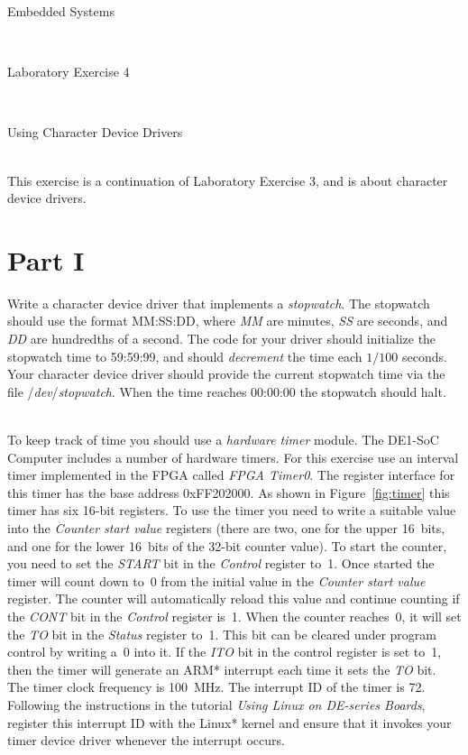 \documentclass[epsfig,10pt,fullpage]{article}
\newcommand{\LabNum}{4}
\begin{document}
\centerline{\huge Embedded Systems}
~\\
\centerline{\huge Laboratory Exercise \LabNum}
~\\
\centerline{\large Using Character Device Drivers}
~\\

This exercise is a continuation of Laboratory Exercise 3, and is about character device
drivers. 

\section*{Part I}
\noindent
Write a character device driver that implements a {\it stopwatch}. The stopwatch 
should use the format MM:SS:DD, where {\it MM} are minutes, 
{\it SS} are seconds, and {\it DD} are hundredths of a second. The code for your driver 
should initialize the stopwatch time to 59:59:99, and should 
{\it decrement} the time each $1/100$ seconds. Your character device driver should 
provide the current stopwatch time via the file /{\it dev}/{\it stopwatch}. When the 
time reaches 00:00:00 the stopwatch should halt. 

~\\
\noindent
To keep track of time you should use a {\it hardware timer} module. The DE1-SoC Computer 
includes a number of hardware timers.  For this exercise use an interval timer implemented 
in the FPGA called {\it FPGA Timer0}. The register interface for this timer has the base 
address {\sf 0xFF202000}. As shown in Figure~\ref{fig:timer} this timer has six 16-bit 
registers. To use the timer you need to write a suitable value into the {\it Counter start value}
registers (there are two, one for the upper 16~bits, and one for the lower 16~bits of the 
32-bit counter value). To start the counter, you need to set the {\it START} bit in the 
{\it Control} register to~1. Once started the timer will count down to~0 from the initial 
value in the {\it Counter start value} register.  The counter will automatically reload this 
value and continue counting if the {\it CONT} bit in the {\it Control} register is~1. When the 
counter reaches~0, it will set the {\it TO} bit in the {\it Status} register to~1.
This bit can be cleared under program control by writing a~0 into it. If the 
{\it ITO} bit in the control register is set to~1, then the timer will generate an ARM* 
interrupt each time it sets the {\it TO} bit. The timer clock frequency is 100~MHz. 
The interrupt ID of the timer is 72. Following the instructions in the tutorial {\it Using Linux 
on DE-series Boards}, register this interrupt ID with the Linux* kernel and ensure that it invokes 
your timer device driver whenever the interrupt occurs.
\end{document}
